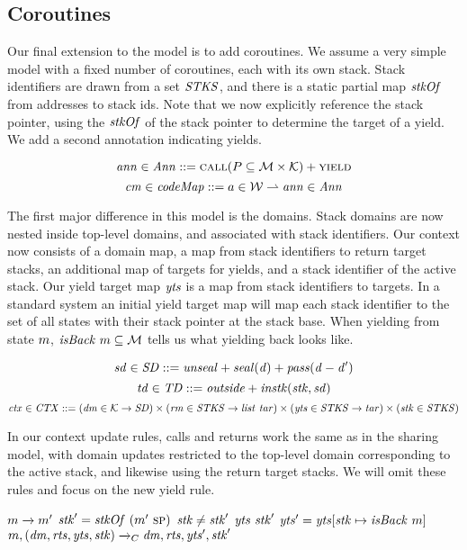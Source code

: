 \documentclass[acmsmall,review,anonymous]{acmart}\settopmatter{printfolios=true,printccs=false,printacmref=false}
\newcommand*{\rsp}{\textsc{sp}}
\begin{document}
\subsection{Coroutines}

Our final extension to the model is to add coroutines. We assume a very simple model with
a fixed number of coroutines, each with its own stack.
Stack identifiers are drawn from a set \(\mathit{STKS}\), and there is a static partial map
\(\mathit{stkOf}\) from addresses to stack ids. Note that we now explicitly reference the stack
pointer, using the \(\mathit{stkOf}\) of the stack pointer to determine the target of a yield.
We add a second annotation indicating yields.

\[\mathit{ann} \in \mathit{Ann} ::= \text{\sc call}(P \subseteq {\mathcal M} \times {\mathcal K}) + \text{\sc yield}\]
\[\mathit{cm} \in \mathit{codeMap} ::= a \in {\mathcal W} \rightharpoonup \mathit{ann} \in \mathit{Ann}\]

The first major difference in this model is the domains. Stack domains are now nested inside
top-level domains, and associated with stack identifiers.
Our context now consists of a domain map, a map from stack identifiers to return target stacks,
an additional map of targets for yields, and a stack identifier of the active stack.
Our yield target map \(\mathit{yts}\) is a map from stack identifiers to targets.
In a standard system an initial yield target map will map each stack identifier to the
set of all states with their stack pointer at the stack base. When yielding from state \(m\),
\(\mathit{isBack} ~ m \subseteq {\mathcal M}\) tells us what yielding back looks like.

\[\mathit{sd} \in \mathit{SD} ::= \mathit{unseal} + \mathit{seal(d)} + \mathit{pass(d-d')}\]
\[\mathit{td} \in \mathit{TD} ::= \mathit{outside} + \mathit{instk}(\mathit{stk},\mathit{sd})\]
\[\mathit{ctx} \in \mathit{CTX} ::= (\mathit{dm} \in {\mathcal K} \rightarrow \mathit{SD}) \times
(\mathit{rm} \in \mathit{STKS} \rightarrow \mathit{list} ~ \mathit{tar}) \times (\mathit{yts} \in \mathit{STKS} \rightarrow
\mathit{tar}) \times (\mathit{stk} \in \mathit{STKS})\]

In our context update rules, calls and returns work the same as in the sharing model,
with domain updates restricted to the top-level domain corresponding to the active stack,
and likewise using the return target stacks. We will omit these rules and focus on the new yield rule.

\judgmentthreebr[ Yield]
                {\(\codemap ~ (\mach ~ \PCname) = \yieldmap\)}
                {\(m \xrightarrow{} m'\)}
                {\(\stackid' = \stackof ~ (\mach'~ \rsp)\)}
                {\(\mathit{stk} \not = \mathit{stk}'\)}
                {\(\mathit{yts} ~ \mathit{stk}'\)}
                {\(\mathit{yts}' = \mathit{yts}[\mathit{stk} \mapsto \mathit{isBack} ~ m]\)}
                {\(m,(\mathit{dm},\mathit{rts},\mathit{yts},\mathit{stk}) \xrightarrow{}_C \mathit{dm},\mathit{rts},\mathit{yts}',\mathit{stk}'\)}
\end{document}
